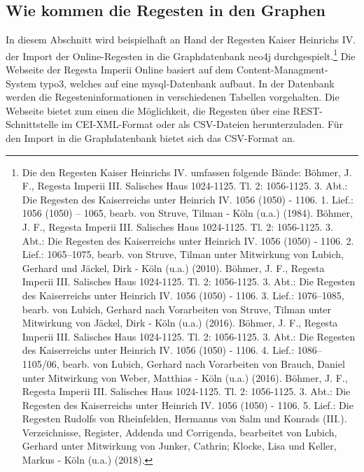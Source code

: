 \hypertarget{wie-kommen-die-regesten-in-den-graphen}{%
\subsection{Wie kommen die Regesten in den
Graphen}\label{wie-kommen-die-regesten-in-den-graphen}}

In diesem Abschnitt wird beispielhaft an Hand der Regesten Kaiser
Heinrichs IV. der Import der Online-Regesten in die Graphdatenbank neo4j
durchgespielt.\footnote{Die den Regesten Kaiser Heinrichs IV. umfassen
  folgende Bände: Böhmer, J. F., Regesta Imperii III. Salisches Haus
  1024-1125. Tl. 2: 1056-1125. 3. Abt.: Die Regesten des Kaiserreichs
  unter Heinrich IV. 1056 (1050) - 1106. 1. Lief.: 1056 (1050) -- 1065,
  bearb. von Struve, Tilman - Köln (u.a.) (1984). Böhmer, J. F., Regesta
  Imperii III. Salisches Haus 1024-1125. Tl. 2: 1056-1125. 3. Abt.: Die
  Regesten des Kaiserreichs unter Heinrich IV. 1056 (1050) - 1106. 2.
  Lief.: 1065--1075, bearb. von Struve, Tilman unter Mitwirkung von
  Lubich, Gerhard und Jäckel, Dirk - Köln (u.a.) (2010). Böhmer, J. F.,
  Regesta Imperii III. Salisches Haus 1024-1125. Tl. 2: 1056-1125. 3.
  Abt.: Die Regesten des Kaiserreichs unter Heinrich IV. 1056 (1050) -
  1106. 3. Lief.: 1076--1085, bearb. von Lubich, Gerhard nach
  Vorarbeiten von Struve, Tilman unter Mitwirkung von Jäckel, Dirk -
  Köln (u.a.) (2016). Böhmer, J. F., Regesta Imperii III. Salisches Haus
  1024-1125. Tl. 2: 1056-1125. 3. Abt.: Die Regesten des Kaiserreichs
  unter Heinrich IV. 1056 (1050) - 1106. 4. Lief.: 1086--1105/06, bearb.
  von Lubich, Gerhard nach Vorarbeiten von Brauch, Daniel unter
  Mitwirkung von Weber, Matthias - Köln (u.a.) (2016). Böhmer, J. F.,
  Regesta Imperii III. Salisches Haus 1024-1125. Tl. 2: 1056-1125. 3.
  Abt.: Die Regesten des Kaiserreichs unter Heinrich IV. 1056 (1050) -
  1106. 5. Lief.: Die Regesten Rudolfs von Rheinfelden, Hermanns von
  Salm und Konrads (III.). Verzeichnisse, Register, Addenda und
  Corrigenda, bearbeitet von Lubich, Gerhard unter Mitwirkung von
  Junker, Cathrin; Klocke, Lisa und Keller, Markus - Köln (u.a.) (2018).}
Die Webseite der Regesta Imperii Online basiert auf dem
Content-Managment-System typo3, welches auf eine mysql-Datenbank
aufbaut. In der Datenbank werden die Regesteninformationen in
verschiedenen Tabellen vorgehalten. Die Webseite bietet zum einen die
Möglichkeit, die Regesten über eine REST-Schnittstelle im CEI-XML-Format
oder als CSV-Dateien herunterzuladen. Für den Import in die
Graphdatenbank bietet sich das CSV-Format an.

